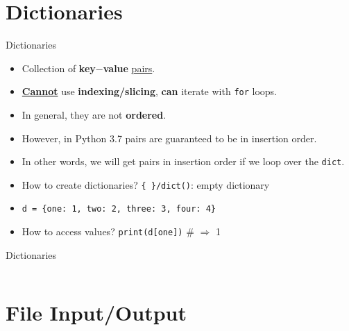     \section{Dictionaries}
    \begin{frame}{Dictionaries}
        \LARGE
        \begin{itemize}
            \item Collection of \textbf{key$-$value} \underline{pairs}.
            \pause
            \item \underline{\textbf{Cannot}} use \textbf{indexing/slicing}, \textbf{can} iterate with \texttt{for} loops. 
            \pause
            \item In general, they are not \textbf{ordered}. 
            \pause
            \item However, in Python 3.7 pairs are guaranteed to be in insertion order.
            \pause
            \item In other words, we will get pairs in insertion order if we loop over the \texttt{dict}.
            \pause
            \item How to create dictionaries?
            \pause
             \texttt{\{\ \}/dict()}: empty dictionary
            \pause
            \item \texttt{d = \{\textquotesingle one\textquotesingle : 1, \textquotesingle two\textquotesingle : 2, \textquotesingle three\textquotesingle : 3, \textquotesingle four\textquotesingle : 4\}}
            \pause
            \item How to access values? 
            \pause
             \texttt{print(d[\textquotesingle one\textquotesingle ])} \# $\Rightarrow$ 1
        \end{itemize}
    \end{frame}

    \begin{frame}{Dictionaries}
        \large
        \inputminted[frame=single,framesep=2pt]{python3}{../Lecture5/code-examples/dicts.py}
    \end{frame}

    \section{File Input/Output}

